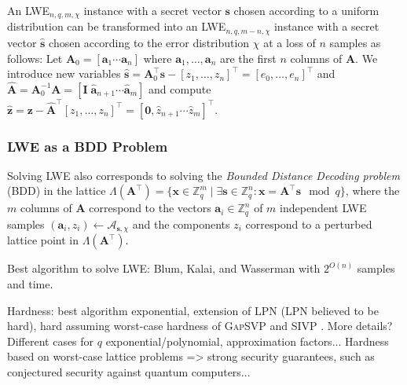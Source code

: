 \documentclass[
  a4paper,  %
  twoside,  %
  bibliography=totoc,
  headsepline,
  cleardoublepage=empty,
  parskip=half,
  draft=false
]{scrbook}
\begin{document}
An LWE$_{n, q, m, \chi}$ instance with a secret vector $\mathbf{s}$ chosen according to a uniform distribution can be transformed into an LWE$_{n, q, m-n, \chi}$ instance with a secret vector $\hat{\mathbf{s}}$ chosen according to the error distribution $\chi$ at a loss of $n$ samples as follows: Let $\mathbf{A}_0 = \left[ \mathbf{a}_1 \cdots \mathbf{a}_n\right]$ where $\mathbf{a}_1, \ldots, \mathbf{a}_n$ are the first $n$ columns of $\mathbf{A}$. We introduce new variables $\hat{\mathbf{s}} = \mathbf{A}^\intercal_0 \mathbf{s}  - \left[z_1, \ldots, z_n\right]^\intercal = \left[e_0, \ldots, e_n\right]^\intercal$ and $\hat{\mathbf{A}} = \mathbf{A}_0^{-1} \mathbf{A} = \left[\mathbf{I} \; \hat{\mathbf{a}}_{n+1} \cdots \hat{\mathbf{a}}_{m}\right]$ and compute $\hat{\mathbf{z}} = \mathbf{z} -  \hat{\mathbf{A}}^\intercal \left[z_1, \ldots, z_n\right]^\intercal  = \left[\mathbf{0}, \hat{z}_{n+1} \cdots \hat{z}_{m} \right]^\intercal$. %


\subsubsection{LWE as a BDD Problem} \label{sec:lwe-bdd} %
Solving LWE also corresponds to solving the \textit{Bounded Distance Decoding problem} (BDD) in the lattice $\Lambda(\mathbf{A}^\intercal) = \{ \mathbf{x} \in \mathbb{Z}_q^m \mid \exists \mathbf{s} \in \mathbb{Z}_q^n : \mathbf{x} = \mathbf{A}^\intercal \mathbf{s}  \mod q \}$, where the $m$ columns of $\mathbf{A}$ correspond to the vectors $\mathbf{a}_i \in \mathbb{Z}_q^n$ of $m$ independent LWE samples $(\mathbf{a}_i, z_i) \leftarrow \mathcal{A}_{\mathbf{s}, \chi}$ and the components $z_i$ correspond to a perturbed lattice point in $\Lambda(\mathbf{A}^\intercal)$. %



Best algorithm to solve LWE: Blum, Kalai, and Wasserman \cite{BKW03} with $2^{O(n)}$ samples and time. %

Hardness: best algorithm exponential, extension of LPN (LPN believed to be hard), hard assuming worst-case hardness of \textsc{GapSVP} %
and \textsc{SIVP} \cite{Reg05, Pei09}. More details? Different cases for $q$ exponential/polynomial, approximation factors...
Hardness based on worst-case lattice problems => strong security guarantees, such as conjectured security against quantum computers...
\end{document}
